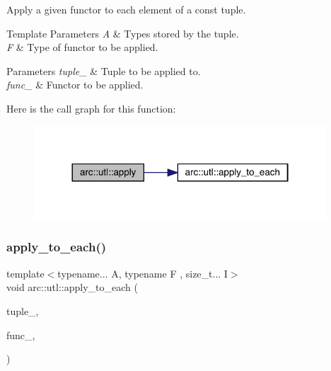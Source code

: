 Apply a given functor to each element of a const tuple.


\begin{DoxyTemplParams}{Template Parameters}
{\em A} & Types stored by the tuple. \\
\hline
{\em F} & Type of functor to be applied.\\
\hline
\end{DoxyTemplParams}

\begin{DoxyParams}{Parameters}
{\em tuple\+\_\+} & Tuple to be applied to. \\
\hline
{\em func\+\_\+} & Functor to be applied. \\
\hline
\end{DoxyParams}
Here is the call graph for this function\+:\nopagebreak
\begin{figure}[H]
\begin{center}
\leavevmode
\includegraphics[width=308pt]{namespacearc_1_1utl_a6dadc719c6540032592f36b5c14cae27_cgraph}
\end{center}
\end{figure}
\mbox{\label{namespacearc_1_1utl_a5421e6de5c0a785ee70d9546d6ef0c41}} 
\subsubsection{\texorpdfstring{apply\+\_\+to\+\_\+each()}{apply\_to\_each()}\hspace{0.1cm}{\footnotesize\ttfamily [1/2]}}
{\footnotesize\ttfamily template$<$typename... A, typename F , size\+\_\+t... I$>$ \\
void arc\+::utl\+::apply\+\_\+to\+\_\+each (\begin{DoxyParamCaption}\item[{std\+::tuple$<$ A... $>$ \&}]{tuple\+\_\+,  }\item[{F}]{func\+\_\+,  }\item[{std\+::index\+\_\+sequence$<$ I... $>$}]{ }\end{DoxyParamCaption})}

